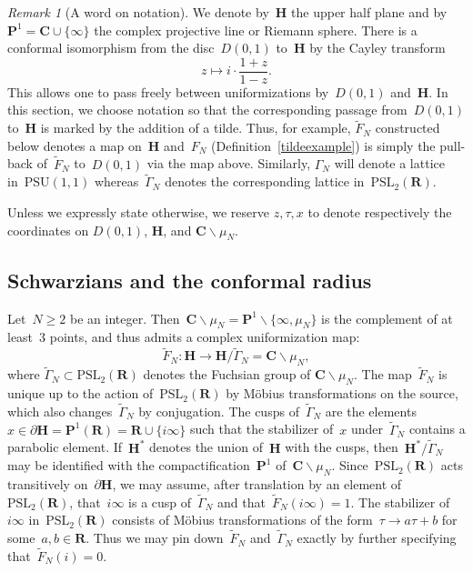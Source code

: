 \documentclass[10pt]{amsart}
\def\PSL{\mathrm{PSL}}
\renewcommand\setminus{\smallsetminus}
\def\wGamma{\widetilde{\Gamma}}
\def\wF{\widetilde{F}}
\def\SO{\mathrm{SO}}
\def\PSU{\mathrm{PSU}}
\def\R{\mathbf{R}}
\renewcommand\mathbb{\mathbf}
\theoremstyle{remark}
\newtheorem{remark}[subsubsection]{Remark}
\numberwithin{equation}{subsection}
\def\C{\mathbf{C}}
\def\H{\mathbf{H}}
\begin{document}
\begin{remark}[A word on notation]
We denote by~$\H$  the upper half plane and by $\mathbb{P}^1 = \C \cup \{\infty\}$ the complex projective line or Riemann sphere. There is a conformal isomorphism from the disc~$D(0,1)$ to~$\H$
by the Cayley transform
$$z \mapsto 
 i \cdot \frac{1+z}{1-z}.$$
 This allows one to pass freely between uniformizations by~$D(0,1)$ and~$\H$.
 In this section, we choose notation so that the corresponding passage from~$D(0,1)$
 to~$\H$ is marked by the addition of a tilde. Thus, for example, $\wF_N$ constructed
 below denotes a map on~$\H$ and~$F_N$ (Definition~\ref{tildeexample}) is simply
 the pull-back of~$\wF_N$ to~$D(0,1)$ via the map above. Similarly, $\Gamma_N$
 will denote a lattice in~$\PSU(1,1)$ whereas~$\wGamma_N$ denotes the corresponding lattice in~$\PSL_2(\R)$.
 
Unless  we expressly state otherwise, we reserve  $z, \tau, x$ to denote respectively the coordinates on $D(0,1)$, $\H$, and $\C\setminus \mu_N$.
 \end{remark}
 
  \subsection{Schwarzians and the conformal radius}
\label{section:normalizations}
Let~$N \ge 2$ be an integer. Then~$ \mathbf{C} \setminus \mu_N = \mathbf{P}^1 \setminus \{\infty,\mu_N\}$
is the complement of at least~$3$ points, and thus admits a complex uniformization map:
$$\wF_N: \H \rightarrow \H/\wGamma_N = \mathbf{C} \setminus \mu_N,$$
where $\wGamma_N\subset \PSL_2(\R)$ denotes the Fuchsian group of $\mathbf{C} \setminus \mu_N$.
The map~$\wF_N$ is unique up to the action of~$\PSL_2(\R)$ by M\"{o}bius transformations
on the source,
which also changes~$\wGamma_N$ by conjugation.
The cusps of~$\wGamma_N$ are the elements~$x \in  \partial \H = \mathbf{P}^1(\R) = \R \cup \{i \infty\}$
such that the stabilizer of~$x$
under~$\wGamma_N$ contains a parabolic element. If~$\H^*$ denotes the union of~$\H$ with the cusps,
then~$\H^*/\wGamma_N$ may be identified with the compactification~$\mathbf{P}^1$
of~$\C \setminus \mu_N$. Since~$\PSL_2(\R)$ acts transitively on~$\partial \H$, we may
assume, after
translation by an element of~$\PSL_2(\R)$,  that~$i \infty$ is a cusp of~$\wGamma_N$
and  that~$\wF_N(i \infty) = 1$.
The stabilizer of~$i \infty$ in~$\PSL_2(\R)$ consists of M\"{o}bius transformations of the 
form~$\tau \rightarrow a \tau + b$ for some~$a,b \in \R$. Thus we may pin down~$\wF_N$ and~$\wGamma_N$
exactly by further specifying that~$\wF_N(i) = 0$.
\end{document}
